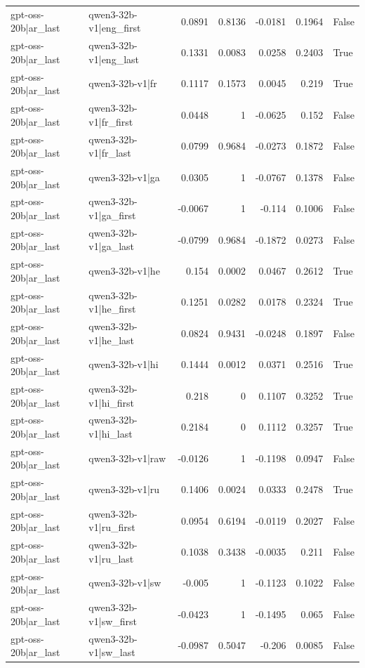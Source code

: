 \begin{table}
\begin{tabular}{l l r r r r l}
gpt-oss-20b|ar_last & qwen3-32b-v1|eng_first & 0.0891 & 0.8136 & -0.0181 & 0.1964 & False \\
gpt-oss-20b|ar_last & qwen3-32b-v1|eng_last & 0.1331 & 0.0083 & 0.0258 & 0.2403 & True \\
gpt-oss-20b|ar_last & qwen3-32b-v1|fr & 0.1117 & 0.1573 & 0.0045 & 0.219 & True \\
gpt-oss-20b|ar_last & qwen3-32b-v1|fr_first & 0.0448 & 1 & -0.0625 & 0.152 & False \\
gpt-oss-20b|ar_last & qwen3-32b-v1|fr_last & 0.0799 & 0.9684 & -0.0273 & 0.1872 & False \\
gpt-oss-20b|ar_last & qwen3-32b-v1|ga & 0.0305 & 1 & -0.0767 & 0.1378 & False \\
gpt-oss-20b|ar_last & qwen3-32b-v1|ga_first & -0.0067 & 1 & -0.114 & 0.1006 & False \\
gpt-oss-20b|ar_last & qwen3-32b-v1|ga_last & -0.0799 & 0.9684 & -0.1872 & 0.0273 & False \\
gpt-oss-20b|ar_last & qwen3-32b-v1|he & 0.154 & 0.0002 & 0.0467 & 0.2612 & True \\
gpt-oss-20b|ar_last & qwen3-32b-v1|he_first & 0.1251 & 0.0282 & 0.0178 & 0.2324 & True \\
gpt-oss-20b|ar_last & qwen3-32b-v1|he_last & 0.0824 & 0.9431 & -0.0248 & 0.1897 & False \\
gpt-oss-20b|ar_last & qwen3-32b-v1|hi & 0.1444 & 0.0012 & 0.0371 & 0.2516 & True \\
gpt-oss-20b|ar_last & qwen3-32b-v1|hi_first & 0.218 & 0 & 0.1107 & 0.3252 & True \\
gpt-oss-20b|ar_last & qwen3-32b-v1|hi_last & 0.2184 & 0 & 0.1112 & 0.3257 & True \\
gpt-oss-20b|ar_last & qwen3-32b-v1|raw & -0.0126 & 1 & -0.1198 & 0.0947 & False \\
gpt-oss-20b|ar_last & qwen3-32b-v1|ru & 0.1406 & 0.0024 & 0.0333 & 0.2478 & True \\
gpt-oss-20b|ar_last & qwen3-32b-v1|ru_first & 0.0954 & 0.6194 & -0.0119 & 0.2027 & False \\
gpt-oss-20b|ar_last & qwen3-32b-v1|ru_last & 0.1038 & 0.3438 & -0.0035 & 0.211 & False \\
gpt-oss-20b|ar_last & qwen3-32b-v1|sw & -0.005 & 1 & -0.1123 & 0.1022 & False \\
gpt-oss-20b|ar_last & qwen3-32b-v1|sw_first & -0.0423 & 1 & -0.1495 & 0.065 & False \\
gpt-oss-20b|ar_last & qwen3-32b-v1|sw_last & -0.0987 & 0.5047 & -0.206 & 0.0085 & False \\

\end{tabular}
\end{table}
